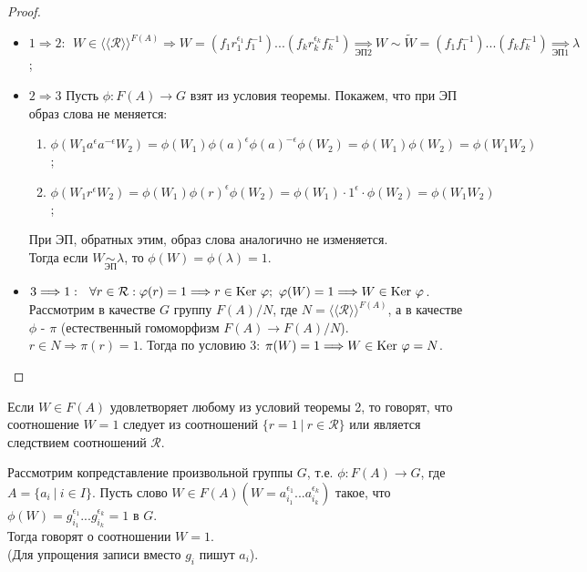 \begin{proof}\tab
    \begin{itemize}
        \item $1 \Longrightarrow 2: \ \ W \in \langle \langle \mathcal{R} \rangle \rangle^{F(A)} \Longrightarrow W = (f_1r_1^{\epsilon_1}f_1^{-1})...(f_kr_k^{\epsilon_k}f_k^{-1}) \underset{\text{ЭП2}}{\Longrightarrow} W \sim \tilde{W} = (f_1f_1^{-1})...(f_kf_k^{-1}) \underset{\text{ЭП1}}{\Longrightarrow} \lambda$;
        \item $2 \Longrightarrow 3$ Пусть $\phi: F(A) \rightarrow G$ взят из условия теоремы. Покажем, что при ЭП образ слова не меняется:
        \begin{enumerate}
            \item $\phi(W_1a^\epsilon a^{-\epsilon}W_2) =  \phi(W_1)\phi(a)^\epsilon\phi(a)^{-\epsilon}\phi(W_2) = \phi(W_1)\phi(W_2) = \phi(W_1W_2)$;
            \item $\phi(W_1r^\epsilon W_2) =  \phi(W_1)\phi(r)^\epsilon\phi(W_2) = \phi(W_1)\cdot 1^\epsilon \cdot \phi(W_2) = \phi(W_1W_2)$;
        \end{enumerate}
        При ЭП, обратных этим, образ слова аналогично не изменяется.\\
        Тогда если $W \underset{\text{ЭП}}{\sim} \lambda$, то $\phi(W) = \phi(\lambda) = 1$.  
        \item $3 \Longrightarrow 1: \ \ \forall r \in \mathcal{R}: \phi(r) = 1 \Longrightarrow r \in \textup{Ker }\phi; \ \phi(W) = 1 \Longrightarrow W \in \textup{Ker }\phi$.\\
        Рассмотрим в качестве $G$ группу $F(A)/N$, где $N = \langle \langle \mathcal{R} \rangle \rangle^{F(A)}$, а в качестве $\phi$ - $\pi$ (естественный гомоморфизм $F(A) \rightarrow F(A)/N$).\\
        $r \in N \Longrightarrow \pi(r) = 1$. Тогда по условию 3: $\pi(W) = 1 \Longrightarrow W \in \textup{Ker }\phi = N$.
    \end{itemize}
\end{proof}
\begin{definition}
    Если $W \in F(A)$ удовлетворяет любому из условий теоремы 2, то говорят, что соотношение $W = 1$ следует из соотношений $\{r = 1 \ | \ r \in \mathcal{R}\}$ или является следствием соотношений $\mathcal{R}$.
\end{definition}
\begin{definition}
    Рассмотрим копредставление произвольной группы $G$, т.е. $\phi: F(A) \rightarrow G$, где $A = \{a_i \ | \ i \in I\}$. Пусть слово $W \in F(A) (W = a_{i_1}^{\epsilon_1}...a_{i_k}^{\epsilon_k})$ такое, что $\phi(W) = g_{i_1}^{\epsilon_1}...g_{i_k}^{\epsilon_k} = 1$ в $G$.\\
    Тогда говорят о соотношении $W = 1$.\\
    (Для упрощения записи вместо $g_i$ пишут $a_i$).
\end{definition}
